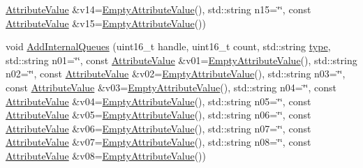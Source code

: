 \begin{DoxyCompactItemize}
\hyperlink{classns3_1_1AttributeValue}{Attribute\+Value} \&v14=\hyperlink{classns3_1_1EmptyAttributeValue}{Empty\+Attribute\+Value}(), std\+::string n15=\char`\"{}\char`\"{}, const \hyperlink{classns3_1_1AttributeValue}{Attribute\+Value} \&v15=\hyperlink{classns3_1_1EmptyAttributeValue}{Empty\+Attribute\+Value}())
\item 
void \hyperlink{classns3_1_1TrafficControlHelper_aefc1be32222be2d9aa714367552c7179}{Add\+Internal\+Queues} (uint16\+\_\+t handle, uint16\+\_\+t count, std\+::string \hyperlink{visualizer-ideas_8txt_add98db9e15e2a58cf2b57623e7aa893a}{type}, std\+::string n01=\char`\"{}\char`\"{}, const \hyperlink{classns3_1_1AttributeValue}{Attribute\+Value} \&v01=\hyperlink{classns3_1_1EmptyAttributeValue}{Empty\+Attribute\+Value}(), std\+::string n02=\char`\"{}\char`\"{}, const \hyperlink{classns3_1_1AttributeValue}{Attribute\+Value} \&v02=\hyperlink{classns3_1_1EmptyAttributeValue}{Empty\+Attribute\+Value}(), std\+::string n03=\char`\"{}\char`\"{}, const \hyperlink{classns3_1_1AttributeValue}{Attribute\+Value} \&v03=\hyperlink{classns3_1_1EmptyAttributeValue}{Empty\+Attribute\+Value}(), std\+::string n04=\char`\"{}\char`\"{}, const \hyperlink{classns3_1_1AttributeValue}{Attribute\+Value} \&v04=\hyperlink{classns3_1_1EmptyAttributeValue}{Empty\+Attribute\+Value}(), std\+::string n05=\char`\"{}\char`\"{}, const \hyperlink{classns3_1_1AttributeValue}{Attribute\+Value} \&v05=\hyperlink{classns3_1_1EmptyAttributeValue}{Empty\+Attribute\+Value}(), std\+::string n06=\char`\"{}\char`\"{}, const \hyperlink{classns3_1_1AttributeValue}{Attribute\+Value} \&v06=\hyperlink{classns3_1_1EmptyAttributeValue}{Empty\+Attribute\+Value}(), std\+::string n07=\char`\"{}\char`\"{}, const \hyperlink{classns3_1_1AttributeValue}{Attribute\+Value} \&v07=\hyperlink{classns3_1_1EmptyAttributeValue}{Empty\+Attribute\+Value}(), std\+::string n08=\char`\"{}\char`\"{}, const \hyperlink{classns3_1_1AttributeValue}{Attribute\+Value} \&v08=\hyperlink{classns3_1_1EmptyAttributeValue}{Empty\+Attribute\+Value}())
\item 

\end{DoxyCompactItemize}
